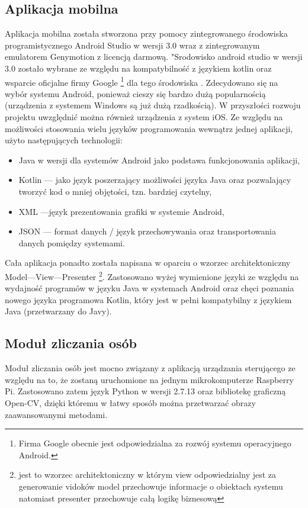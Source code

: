 \subsection{Aplikacja mobilna}
Aplikacja mobilna została stworzona przy pomocy zintegrowanego środowiska programistycznego Android Studio w wersji 3.0 wraz z zintegrowanym emulatorem Genymotion z licencją darmową. "Srodowisko android studio w wersji 3.0 zostało wybrane ze względu na kompatybilność z językiem kotlin oraz wsparcie oficjalne firmy Google
 \footnote{Firma Google obecnie jest odpowiedzialna za rozwój systemu operacyjnego Android.}
 dla tego środowiska . Zdecydowano się na wybór systemu Android, ponieważ cieszy się bardzo dużą popularnością (urządzenia z systemem Windows są już dużą rzadkością). W przyszłości rozwoju projektu uwzględnić można również urządzenia z system iOS. Ze względu na możliwości stosowania wielu języków programowania wewnątrz jednej aplikacji, użyto następujących technologii:
\begin{itemize}
	\item Java w wersji dla systemów Android jako podstawa funkcjonowania aplikacji,
	\item Kotlin --- jako język poszerzający możliwości języka Java oraz pozwalający tworzyć kod o mniej objętości, tzn. bardziej czytelny,
	\item XML ---język prezentowania grafiki w systemie Android,
	\item JSON --- format danych / język przechowywania oraz transportowania danych pomiędzy systemami.
\end{itemize}
Cała aplikacja ponadto została napisana w oparciu o wzorzec architektoniczny Model---View---Presenter \footnote{ jest to wzorzec architektoniczny w którym view odpowiedzialny jest za generowanie vidoków model przechowuje informacje o obiektach systemu natomiast presenter przechowuje całą logikę biznesową}. Zastosowano wyżej wymienione języki ze względu na wydajność programów w języku Java w systemach Android oraz chęci poznania nowego języka programowa Kotlin, który jest w pełni kompatybilny z językiem Java (przetwarzany do Javy).  

\subsection{Moduł zliczania osób}
Moduł zliczania osób jest mocno związany z aplikacją urządzania sterującego ze względu na to, że zostaną uruchomione na jednym mikrokomputerze Raspberry Pi. Zastosowano zatem język Python w wersji 2.7.13 oraz bibliotekę graficzną Open-CV, dzięki któremu w łatwy sposób można przetwarzać obrazy zaawansowanymi metodami. 

